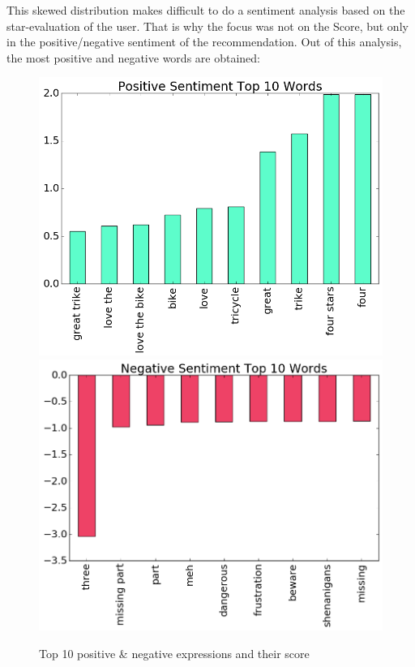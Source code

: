 This skewed distribution makes difficult to do a sentiment analysis based on the star-evaluation of the user. That is why the focus was not on the Score, but only in the positive/negative sentiment of the recommendation. Out of this analysis, the most positive and negative words are obtained:

\begin{figure}
	\caption{Top 10 positive \& negative expressions and their score}
	\includegraphics[width=1\linewidth]{pdf/Predicting_Sentiment_and_Helpfulness/Predicting_Sentiment_and_Helpfulness_files/Predicting_Sentiment_and_Helpfulness_13_2}
	\endminipage
	\includegraphics[width=1\linewidth]{pdf/Predicting_Sentiment_and_Helpfulness/Predicting_Sentiment_and_Helpfulness_files/Predicting_Sentiment_and_Helpfulness_13_1}
	\endminipage
	\\[6pt]
\end{figure}

